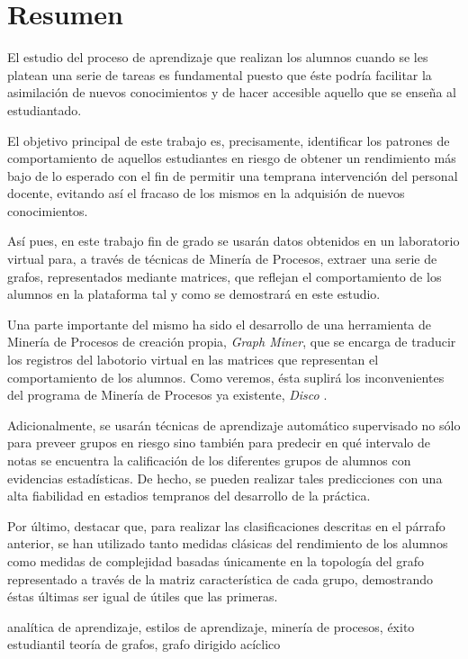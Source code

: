\chapter*{Resumen}


El estudio del proceso de aprendizaje que realizan los alumnos cuando se les platean una serie de tareas es fundamental puesto que éste podría facilitar la asimilación de nuevos conocimientos y de hacer accesible aquello que se enseña al estudiantado.

El objetivo principal de este trabajo es, precisamente, identificar los patrones de comportamiento de aquellos estudiantes en riesgo de obtener un rendimiento más bajo de lo esperado con el fin de permitir una temprana intervención del personal docente, evitando así el fracaso de los mismos en la adquisión de nuevos conocimientos.

Así pues, en este trabajo fin de grado se usarán datos obtenidos en un laboratorio virtual para, a través de técnicas de Minería de Procesos, extraer una serie de grafos, representados mediante matrices, que reflejan el comportamiento de los alumnos en la plataforma tal y como se demostrará en este estudio.

Una parte importante del mismo ha sido el desarrollo de una herramienta de Minería de Procesos de creación propia, \emph{Graph Miner}, que se encarga de traducir los registros del labotorio virtual en las matrices que representan el comportamiento de los alumnos. Como veremos, ésta suplirá los inconvenientes del programa de Minería de Procesos ya existente, \emph{Disco} \cite{gunther2012disco}.

Adicionalmente, se usarán técnicas de aprendizaje automático supervisado no sólo para preveer grupos en riesgo sino también para predecir en qué intervalo de notas se encuentra la calificación de los diferentes grupos de alumnos con evidencias estadísticas. De hecho, se pueden realizar tales predicciones con una alta fiabilidad en estadios tempranos del desarrollo de la práctica.

Por último, destacar que, para realizar las clasificaciones descritas en el párrafo anterior, se han utilizado tanto medidas clásicas del rendimiento de los alumnos como medidas de complejidad basadas únicamente en la topología del grafo representado a través de la matriz característica de cada grupo, demostrando éstas últimas ser igual de útiles que las primeras.

\small{ analítica de aprendizaje, \; estilos de aprendizaje, \; minería de procesos, \; éxito estudiantil \; teoría de grafos, \; grafo dirigido acíclico}

\newpage